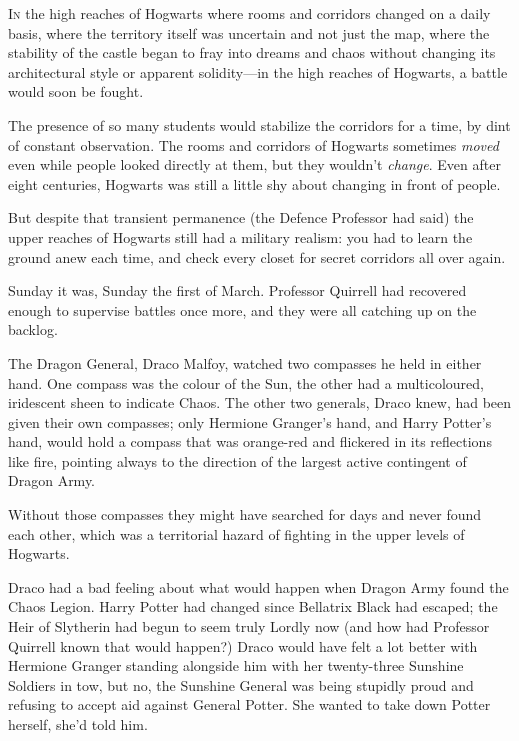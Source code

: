 
\lettrine{I}{n} the high
reaches of Hogwarts where rooms and corridors changed on a daily basis, where the territory itself was uncertain and not just the map, where the stability of the castle began to fray into dreams and chaos without changing its architectural style or apparent solidity—in the high reaches of Hogwarts, a battle would soon be fought.

The presence of so many students would stabilize the corridors for a time, by dint of constant observation. The rooms and corridors of Hogwarts sometimes \emph{moved} even while people looked directly at them, but they wouldn’t \emph{change}. Even after eight centuries, Hogwarts was still a little shy about changing in front of people.

But despite that transient permanence (the Defence Professor had said) the upper reaches of Hogwarts still had a military realism: you had to learn the ground anew each time, and check every closet for secret corridors all over again.

Sunday it was, Sunday the first of March. Professor Quirrell had recovered enough to supervise battles once more, and they were all catching up on the backlog.

The Dragon General, Draco Malfoy, watched two compasses he held in either hand. One compass was the colour of the Sun, the other had a multicoloured, iridescent sheen to indicate Chaos. The other two generals, Draco knew, had been given their own compasses; only Hermione Granger’s hand, and Harry Potter’s hand, would hold a compass that was orange-red and flickered in its reflections like fire, pointing always to the direction of the largest active contingent of Dragon Army.

Without those compasses they might have searched for days and never found each other, which was a territorial hazard of fighting in the upper levels of Hogwarts.

Draco had a bad feeling about what would happen when Dragon Army found the Chaos Legion. Harry Potter had changed since Bellatrix Black had escaped; the Heir of Slytherin had begun to seem truly Lordly now (and how had Professor Quirrell known that would happen?) Draco would have felt a lot better with Hermione Granger standing alongside him with her twenty-three Sunshine Soldiers in tow, but no, the Sunshine General was being stupidly proud and refusing to accept aid against General Potter. She wanted to take down Potter herself, she’d told him.

